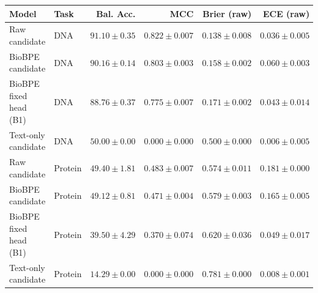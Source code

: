 \begin{tabular}{llrrrr}
\toprule
Model & Task & Bal. Acc. & MCC & Brier (raw) & ECE (raw) \\
\midrule
Raw candidate & DNA & $91.10 \pm 0.35$ & $0.822 \pm 0.007$ & $0.138 \pm 0.008$ & $0.036 \pm 0.005$ \\
BioBPE candidate & DNA & $90.16 \pm 0.14$ & $0.803 \pm 0.003$ & $0.158 \pm 0.002$ & $0.060 \pm 0.003$ \\
BioBPE fixed head (B1) & DNA & $88.76 \pm 0.37$ & $0.775 \pm 0.007$ & $0.171 \pm 0.002$ & $0.043 \pm 0.014$ \\
Text-only candidate & DNA & $50.00 \pm 0.00$ & $0.000 \pm 0.000$ & $0.500 \pm 0.000$ & $0.006 \pm 0.005$ \\
Raw candidate & Protein & $49.40 \pm 1.81$ & $0.483 \pm 0.007$ & $0.574 \pm 0.011$ & $0.181 \pm 0.000$ \\
BioBPE candidate & Protein & $49.12 \pm 0.81$ & $0.471 \pm 0.004$ & $0.579 \pm 0.003$ & $0.165 \pm 0.005$ \\
BioBPE fixed head (B1) & Protein & $39.50 \pm 4.29$ & $0.370 \pm 0.074$ & $0.620 \pm 0.036$ & $0.049 \pm 0.017$ \\
Text-only candidate & Protein & $14.29 \pm 0.00$ & $0.000 \pm 0.000$ & $0.781 \pm 0.000$ & $0.008 \pm 0.001$ \\
\bottomrule
\end{tabular}

